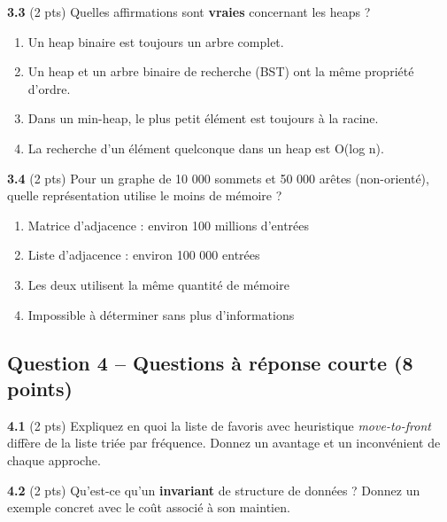 \documentclass[11pt,letterpaper]{article}
\begin{document}
\textbf{3.3} (2 pts) Quelles affirmations sont \textbf{vraies} concernant les heaps ?

\begin{enumerate}[label=\Alph*)]
    \item Un heap binaire est toujours un arbre complet.
    \item Un heap et un arbre binaire de recherche (BST) ont la même propriété d'ordre.
    \item Dans un min-heap, le plus petit élément est toujours à la racine.
    \item La recherche d'un élément quelconque dans un heap est O(log n).
\end{enumerate}

\vspace{1.5cm}

\textbf{3.4} (2 pts) Pour un graphe de 10 000 sommets et 50 000 arêtes (non-orienté), quelle représentation utilise le moins de mémoire ?

\begin{enumerate}[label=\Alph*)]
    \item Matrice d'adjacence : environ 100 millions d'entrées
    \item Liste d'adjacence : environ 100 000 entrées
    \item Les deux utilisent la même quantité de mémoire
    \item Impossible à déterminer sans plus d'informations
\end{enumerate}

\newpage

\subsection*{Question 4 -- Questions à réponse courte (8 points)}

\textbf{4.1} (2 pts) Expliquez en quoi la liste de favoris avec heuristique \textit{move-to-front} diffère de la liste triée par fréquence. Donnez un avantage et un inconvénient de chaque approche.

\vspace{5cm}

\textbf{4.2} (2 pts) Qu'est-ce qu'un \textbf{invariant} de structure de données ? Donnez un exemple concret avec le coût associé à son maintien.

\vspace{5cm}
\end{document}
